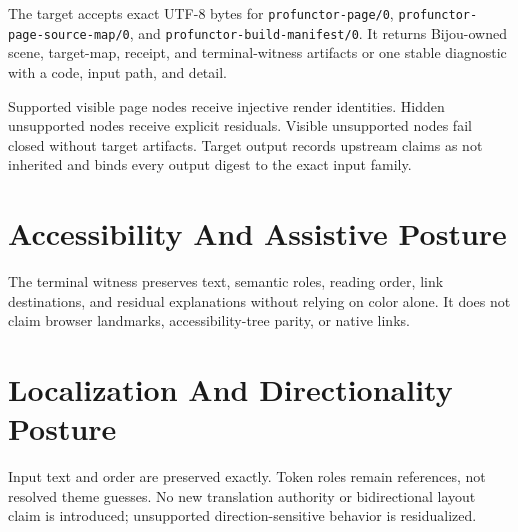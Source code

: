 The target accepts exact UTF-8 bytes for \texttt{p\allowbreak{}r\allowbreak{}o\allowbreak{}f\allowbreak{}u\allowbreak{}n\allowbreak{}c\allowbreak{}t\allowbreak{}o\allowbreak{}r\allowbreak{}-\allowbreak{}p\allowbreak{}a\allowbreak{}g\allowbreak{}e\allowbreak{}/\allowbreak{}0}, \texttt{p\allowbreak{}r\allowbreak{}o\allowbreak{}f\allowbreak{}u\allowbreak{}n\allowbreak{}c\allowbreak{}t\allowbreak{}o\allowbreak{}r\allowbreak{}-\allowbreak{}p\allowbreak{}a\allowbreak{}g\allowbreak{}e\allowbreak{}-\allowbreak{}s\allowbreak{}o\allowbreak{}u\allowbreak{}r\allowbreak{}c\allowbreak{}e\allowbreak{}-\allowbreak{}m\allowbreak{}a\allowbreak{}p\allowbreak{}/\allowbreak{}0}, and \texttt{p\allowbreak{}r\allowbreak{}o\allowbreak{}f\allowbreak{}u\allowbreak{}n\allowbreak{}c\allowbreak{}t\allowbreak{}o\allowbreak{}r\allowbreak{}-\allowbreak{}b\allowbreak{}u\allowbreak{}i\allowbreak{}l\allowbreak{}d\allowbreak{}-\allowbreak{}m\allowbreak{}a\allowbreak{}n\allowbreak{}i\allowbreak{}f\allowbreak{}e\allowbreak{}s\allowbreak{}t\allowbreak{}/\allowbreak{}0}. It returns Bijou-owned scene, target-map, receipt, and terminal-witness artifacts or one stable diagnostic with a code, input path, and detail.

Supported visible page nodes receive injective render identities. Hidden unsupported nodes receive explicit residuals. Visible unsupported nodes fail closed without target artifacts. Target output records upstream claims as not inherited and binds every output digest to the exact input family.

\section{Accessibility And Assistive Posture}\label{record-146-accessibility-and-assistive-posture}

The terminal witness preserves text, semantic roles, reading order, link destinations, and residual explanations without relying on color alone. It does not claim browser landmarks, accessibility-tree parity, or native links.

\section{Localization And Directionality Posture}\label{record-146-localization-and-directionality-posture}

Input text and order are preserved exactly. Token roles remain references, not resolved theme guesses. No new translation authority or bidirectional layout claim is introduced; unsupported direction-sensitive behavior is residualized.

